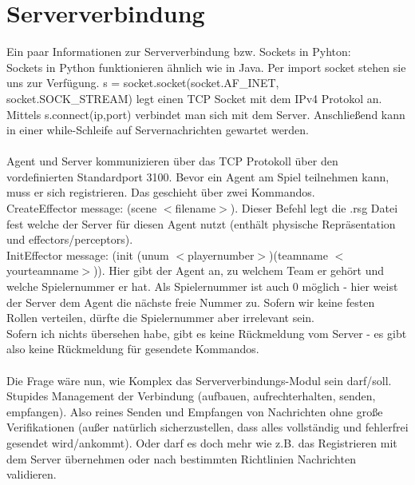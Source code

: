 \section{Serververbindung}
Ein paar Informationen zur Serververbindung bzw. Sockets in Pyhton:\\
Sockets in Python funktionieren ähnlich wie in Java. Per \grqq import socket\grqq{} stehen sie uns zur Verfügung. s = socket.socket(socket.AF\_INET, socket.SOCK\_STREAM) legt einen TCP Socket mit dem IPv4 Protokol an. Mittels s.connect(ip,port) verbindet man sich mit dem Server. Anschließend kann in einer while-Schleife auf Servernachrichten gewartet werden.\\
\\
Agent und Server kommunizieren über das TCP Protokoll über den vordefinierten Standardport 3100. Bevor ein Agent am Spiel teilnehmen kann, muss er sich \grqq registrieren\grqq{}. Das geschieht über zwei Kommandos.\\
CreateEffector message: (scene $<$filename$>$). Dieser Befehl legt die .rsg Datei fest welche der Server für diesen Agent nutzt (enthält physische Repräsentation und effectors/perceptors).\\
InitEffector message: (init (unum $<$playernumber$>$)(teamname $<$yourteamname$>$)). Hier gibt der Agent an, zu welchem Team er gehört und welche Spielernummer er hat. Als Spielernummer ist auch 0 möglich - hier weist der Server dem Agent die nächste freie Nummer zu. Sofern wir keine festen Rollen verteilen, dürfte die Spielernummer aber irrelevant sein.\\
Sofern ich nichts übersehen habe, gibt es keine Rückmeldung vom Server - es gibt also keine Rückmeldung für gesendete Kommandos.\\
\\
Die Frage wäre nun, wie Komplex das Serververbindungs-Modul sein darf/soll. Stupides Management der Verbindung (aufbauen, aufrechterhalten, senden, empfangen). Also reines Senden und Empfangen von Nachrichten ohne große Verifikationen (außer natürlich sicherzustellen, dass alles vollständig und fehlerfrei gesendet wird/ankommt). Oder darf es doch mehr wie z.B. das Registrieren mit dem Server übernehmen oder nach bestimmten Richtlinien Nachrichten validieren.\\
\\